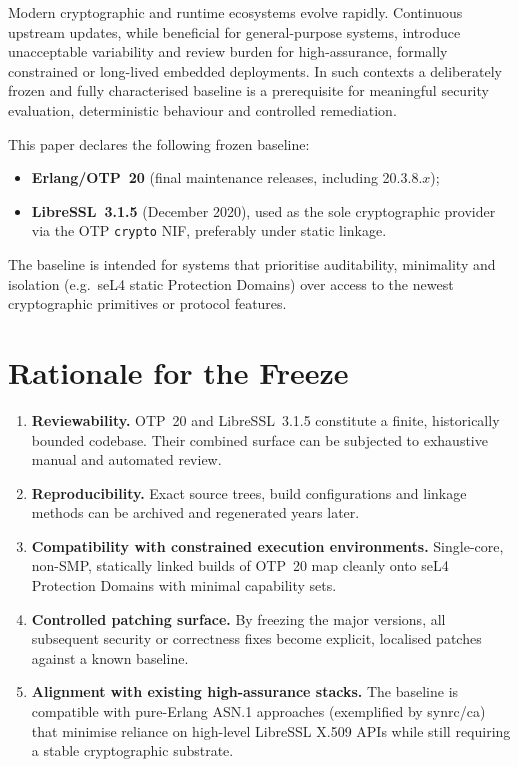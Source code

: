 \documentclass{article}
\begin{document}
Modern cryptographic and runtime ecosystems evolve rapidly. Continuous upstream updates,
while beneficial for general-purpose systems, introduce unacceptable variability and review
burden for high-assurance, formally constrained or long-lived embedded deployments.
In such contexts a deliberately frozen and fully characterised baseline is a prerequisite
for meaningful security evaluation, deterministic behaviour and controlled remediation.

This paper declares the following frozen baseline:

\begin{itemize}
  \item \textbf{Erlang/OTP~20} (final maintenance releases, including 20.3.8.$x$);
  \item \textbf{LibreSSL~3.1.5} (December 2020), used as the sole cryptographic provider
        via the OTP \texttt{crypto} NIF, preferably under static linkage.
\end{itemize}

The baseline is intended for systems that prioritise auditability, minimality and isolation
(e.g.\ seL4 static Protection Domains) over access to the newest cryptographic primitives
or protocol features.

\section{Rationale for the Freeze}
\label{sec:rationale}

\begin{enumerate}
  \item \textbf{Reviewability.}  
        OTP~20 and LibreSSL~3.1.5 constitute a finite, historically bounded codebase.
        Their combined surface can be subjected to exhaustive manual and automated review.

  \item \textbf{Reproducibility.}  
        Exact source trees, build configurations and linkage methods can be archived and
        regenerated years later.

  \item \textbf{Compatibility with constrained execution environments.}  
        Single-core, non-SMP, statically linked builds of OTP~20 map cleanly onto seL4
        Protection Domains with minimal capability sets.

  \item \textbf{Controlled patching surface.}  
        By freezing the major versions, all subsequent security or correctness fixes become
        explicit, localised patches against a known baseline.

  \item \textbf{Alignment with existing high-assurance stacks.}  
        The baseline is compatible with pure-Erlang ASN.1 approaches (exemplified by synrc/ca)
        that minimise reliance on high-level LibreSSL X.509 APIs while still requiring a
        stable cryptographic substrate.
\end{enumerate}
\end{document}
